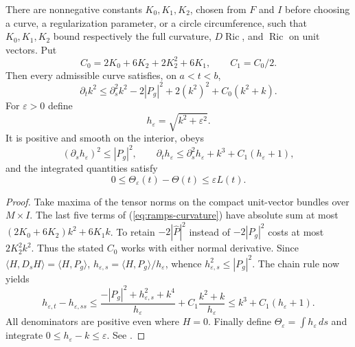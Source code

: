 \begin{proposition}
\label{prop:ramps-regularization}
There are nonnegative constants $K_0,K_1,K_2$, chosen from $F$ and $I$
before choosing a curve, a regularization parameter, or a circle
circumference, such that $K_0,K_1,K_2$ bound respectively the full curvature,
$D\operatorname{Ric}$, and $\operatorname{Ric}$ on unit vectors.  Put
\[
 C_0=2K_0+6K_2+2K_2^2+6K_1,\qquad C_1=C_0/2.
\]
Then every admissible curve satisfies, on $a<t<b$,
\[
 \partial_tk^2\leq\partial_s^2k^2-2|P_g|^2+2(k^2)^2+C_0(k^2+k).
\]
For $\varepsilon>0$ define
\[
 h_\varepsilon=\sqrt{k^2+\varepsilon^2}.
\]
It is positive and smooth on the interior, obeys
\[
 (\partial_sh_\varepsilon)^2\leq|P_g|^2,\qquad
 \partial_th_\varepsilon\leq\partial_s^2h_\varepsilon+k^3+C_1(h_\varepsilon+1),
\]
and the integrated quantities satisfy
\[
 0\leq\Theta_\varepsilon(t)-\Theta(t)\leq\varepsilon L(t).
\]
\end{proposition}
\begin{proof}
Take maxima of the tensor norms on the compact unit-vector bundles over
$M\times I$.  The last five terms of (\ref{eq:ramps-curvature}) have
absolute sum at most $(2K_0+6K_2)k^2+6K_1k$.
To retain $-2|\widehat P|^2$ instead of $-2|P_g|^2$ costs at most
$2K_2^2k^2$.  Thus the stated $C_0$ works with either normal derivative.
Since $\langle H,D_sH\rangle=\langle H,P_g\rangle$,
$h_{\varepsilon,s}=\langle H,P_g\rangle/h_\varepsilon$, whence
$h_{\varepsilon,s}^2\leq|P_g|^2$.
The chain rule now yields
\[
 h_{\varepsilon,t}-h_{\varepsilon,ss}
 \leq\frac{-|P_g|^2+h_{\varepsilon,s}^2+k^4}{h_\varepsilon}
       +C_1\frac{k^2+k}{h_\varepsilon}
 \leq k^3+C_1(h_\varepsilon+1).
\]
All denominators are positive even where $H=0$.  Finally define
$\Theta_\varepsilon=\int h_\varepsilon\,ds$ and integrate
$0\leq h_\varepsilon-k\leq\varepsilon$.
See \cite[Corollary 0.3 and (0.4), pp.~6--7]{MT2015Correction}.
\end{proof}

